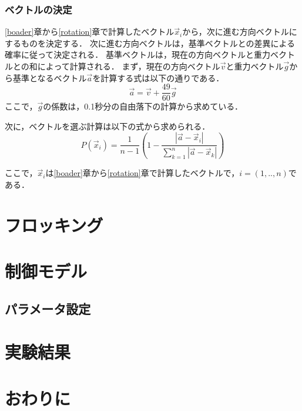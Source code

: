 \documentclass[a4paper,11pt]{jarticle}
\begin{document}
	\subsubsection{ベクトルの決定}
	\ref{boader}章から\ref{rotation}章で計算したベクトル$\vec{x}_i$から，次に進む方向ベクトルにするものを決定する．
	次に進む方向ベクトルは，基準ベクトルとの差異による確率に従って決定される．
	基準ベクトルは，現在の方向ベクトルと重力ベクトルとの和によって計算される．
	まず，現在の方向ベクトル$ \vec{v} $と重力ベクトル$ \vec{g} $から基準となるベクトル$ \vec{a} $を計算する式は以下の通りである．
	\begin{equation}
	\vec{a} = \vec{v} +\frac{49}{60} \vec{g} 
	\end{equation}
	ここで，$ \vec{g} $の係数は，0.1秒分の自由落下の計算から求めている．
	
	次に，ベクトルを選ぶ計算は以下の式から求められる．
	\begin{equation}
	P(\vec{x}_i) = \frac{1}{n-1}(1 - \frac{|\vec{a} - \vec{x}_i |}{\sum_{k=1}^{n}|\vec{a} - \vec{x}_k|})
	\end{equation}
	
	ここで，$ \vec{x}_i $は\ref{boader}章から\ref{rotation}章で計算したベクトルで，$ i = (1,..,n) $である．
	
	\section{フロッキング}
	\section{制御モデル}	
	\subsection{パラメータ設定}
	\section{実験結果}
	\section{おわりに}
	\begin{thebibliography}{99}
		\bibitem{}
	\end{thebibliography}
\end{document}
